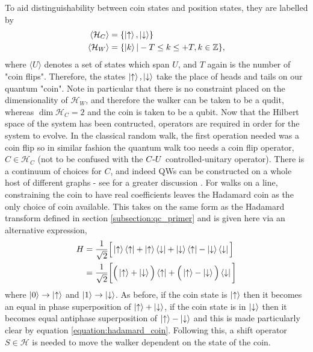 To aid distinguishability between coin states and position states, they are labelled by
\begin{align}
    \langle\mathcal{H}_C\rangle &= \{\ket{\uparrow}, \ket{\downarrow}\}\\
    \langle\mathcal{H}_W\rangle &= \{\ket{k} | -T\leq k \leq +T, k\in\mathbb{Z}\},
\end{align}
where $\langle U \rangle$ denotes a set of states which span $U$, and $T$ again is the number of "coin flips".
Therefore, the states $\ket{\uparrow}, \ket{\downarrow}$ take the place of heads and tails on our quantum "coin". 
Note in particular that there is no constraint placed on the dimensionality of $\mathcal{H}_W$, and therefore the walker can be taken to be a qudit, whereas $\dim{\mathcal{H}_C} = 2$ and the coin is taken to be a qubit.
Now that the Hilbert space of the system has been contructed, operators are required in order for the system to evolve.
In the classical random walk, the first operation needed was a coin flip so in similar fashion the quantum walk too needs a coin flip operator, $C\in \mathcal{H}_C$ (not to be confused with the $C\text{-}U$ controlled-unitary operator).
There is a continuum of choices for $C$, and indeed QWs can be constructed on a whole host of different graphs - see for a greater discussion \cite{Tregenna2003}. 
For walks on a line, constraining the coin to have real coefficients leaves the Hadamard coin as the only choice of coin available.
This takes on the same form as the Hadamard transform defined in section \ref{subsection:qc_primer} and is given here via an alternative expression,
\begin{align}
    H &= \frac{1}{\sqrt{2}}\Big[
    \ket{\uparrow}\bra{\uparrow} +
    \ket{\uparrow}\bra{\downarrow} +
    \ket{\downarrow}\bra{\uparrow} -
    \ket{\downarrow}\bra{\downarrow}\Big]\\
    &= \frac{1}{\sqrt{2}}\bigg[\Big(\ket{\uparrow} + \ket{\downarrow}\Big)\bra{\uparrow} +
    \Big(\ket{\uparrow} - \ket{\downarrow}\Big)\bra{\downarrow}\bigg]
    \label{equation:hadamard_coin}
\end{align}
where $\ket{0} \rightarrow \ket{\uparrow}$ and $\ket{1} \rightarrow \ket{\downarrow}$.
As before, if the coin state is $\ket{\uparrow}$ then it becomes an equal in phase superposition of $\ket{\uparrow} + \ket{\downarrow}$, if the coin state is in $\ket{\downarrow}$ then it becomes equal antiphase superposition of $\ket{\uparrow} - \ket{\downarrow}$ and this is made particularly clear by equation \ref{equation:hadamard_coin}.
Following this, a shift operator $S \in \mathcal{H}$ is needed to move the walker dependent on the state of the coin.
